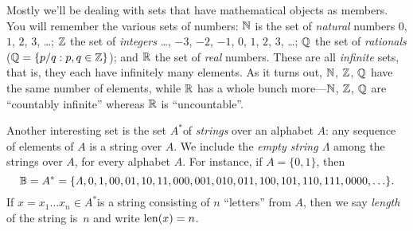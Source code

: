\documentclass[open-logic-section]{subfiles}
\begin{document}

\begin{ex}
Mostly we'll be dealing with sets that have mathematical objects as
members. You will remember the various sets of numbers: $\mathbb{N}$
is the set of \emph{natural} numbers $0$, $1$, $2$, $3$, \dots{};
$\mathbb{Z}$ the set of \emph{integers} \ldots{}, $-3$, $-2$,
$-1$, $0$, $1$, $2$, $3$, \ldots{}; $\mathbb{Q}$ the set of
\emph{rationals} ($\mathbb{Q} = \{ p/q : p,q\in \mathbb{Z} \}$); and
$\mathbb{R}$ the set of \emph{real} numbers. These are all \emph{infinite}
sets, that is, they each have infinitely many elements. As it turns
out, $\mathbb{N}$, $\mathbb{Z}$, $\mathbb{Q}$ have the same number
of elements, while $\mathbb{R}$ has a whole bunch more---$\mathbb{N}$,
$\mathbb{Z}$, $\mathbb{Q}$ are ``countably infinite'' whereas
$\mathbb{R}$ is ``uncountable''.
\end{ex}

\begin{ex}[Strings]
Another interesting set is the set $A^{*}$of
\emph{strings} over an alphabet $A$: any sequence of elements of
$A$ is a string over $A$. We include the \emph{empty string $\Lambda$}
among the strings over $A$, for every alphabet $A$. For instance,
if $A=\{0,1\}$, then 
\[
\mathbb{B} = A^{*}
=\{\Lambda,0,1,00,01,10,11,000,001,010,011,100,101,110,111,0000,\ldots\}.
\]
 If $x=x_{1}\ldots x_{n}\in A^{*}$is a string consisting of $n$
``letters'' from $A$, then we say \emph{length} of the string is~$n$
and write $\mathrm{len}(x)=n$.
\end{ex}
\end{document}

